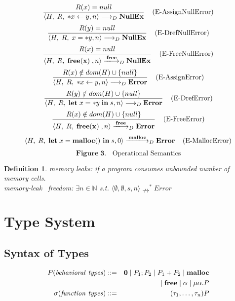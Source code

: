\documentclass[english]{jssst_ppl} %
\newcommand\tB{\;|\;}
\newcommand\LET{\mathbf{let}\;}
\newcommand\FREE{\mathbf{free(x)}\;}
\newcommand\IN{\mathbf{in}\;}
\newcommand\Rtab{\; \; \; \;}
\newcommand\Lfc{\left\{}
\newcommand\Rfc{\right\}}
\newcommand\coma{,\;}
\newcommand\Malloc{\mathbf{malloc}}
\newcommand\Free{\mathbf{free}}
\newtheorem{myDef}{Definition}
\theoremstyle{definition}
\begin{document}
$$
      \frac{R(x) = null}
            {\langle H\coma R\coma  *x \leftarrow y , n \rangle
              \longrightarrow_{D}
             \bf NullEx }
      \Rtab \mbox{(E-AssignNullError)}
$$
$$
      \frac{R(y) = null}
             {\langle H\coma R\coma  x = *y, n \rangle
               \longrightarrow_{D}
              \bf NullEx }
             \Rtab \mbox{(E-DrefNullError)}
$$
$$
     \frac{R(x) =  null }
           {\langle H\coma R\coma  \FREE , n \rangle
             \xlongrightarrow{\Free}_{D} \bf NullEx  }
      \Rtab \mbox{(E-FreeNullError)}
$$
$$
     \frac{R(x) \notin dom(H) \cup \Lfc null \Rfc}
           {\langle H\coma R\coma   *x \leftarrow y,  n \rangle
             \longrightarrow_{D}
           \bf  Error }
    \Rtab \mbox{(E-AssignError)}
$$
$$
      \frac{R(y) \notin dom(H) \cup \Lfc null \Rfc}
           {\langle H\coma R\coma  \LET x  = *y \; \IN s, n \rangle
              \longrightarrow_{D}
                \bf  Error }
      \Rtab \mbox{(E-DrefError)}
$$
%
$$
      \frac{R(x) \notin dom(H) \cup \Lfc null \Rfc}
            {\langle H\coma R\coma  \FREE , n \rangle
              \xlongrightarrow{\Free}_{D}
              \bf Error }
     \Rtab \mbox{(E-FreeError)}
$$
$$
      \langle H\coma R\coma \LET x = \Malloc() \ \IN s ,  0  \rangle
      \xlongrightarrow{\Malloc}_{D}
      \mathbf{Error}
      \Rtab \mbox{(E-MallocError)}
$$
$$
     \mathbf{Figure \; 3.} \;\;  \mbox{ Operational Semantics}
$$
%
\begin{myDef}
memory leaks: if a program consumes unbounded number of memory cells.\\
memory-leak \ freedom: $\exists n \in \mathbb{N}$ s.t. $\langle \emptyset, \emptyset, s, n \rangle \nrightarrow^{*}Error$
\label{df:ml}
\end{myDef}

\section{Type System}

\subsection{Syntax of Types}
     \begin{eqnarray*}
       P (\mathit{behavioral\ types})::=&& {\bf 0} \tB P_{1};P_{2} \tB P_{1}+P_{2} \tB \Malloc\\
       &&\tB \Free \tB \alpha \tB \mu\alpha.P \\
       \sigma (\mathit{function\ types})::=&& (\tau_{1},\dots, \tau_{n}) P
     \end{eqnarray*}
\end{document}
